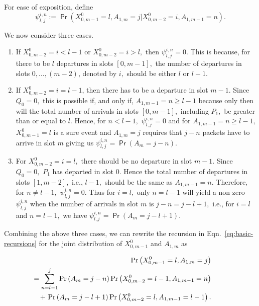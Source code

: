 \documentclass[11pt]{article}
\newcommand{\prob}[1]{\mathsf{\Pr}\left(#1\right)}
\begin{document}
\noindent
For ease of exposition, define
{\small
\begin{displaymath}
  \psi_{l,j}^{i,n}:= \prob{X_{0,m-1}^0=l,A_{1,m} =j | X^0_{0,m-2}=i,
    A_{1,m-1} = n} . 
\end{displaymath}
}
\normalsize

\noindent
We now consider three cases.
\begin{enumerate}
\item If $X^0_{0,m-2} = i < l-1$ or $X^0_{0,m-2} = i > l,$ then
  $\psi_{l,j}^{i,n} =0.$ This is because, for there to be $l$
  departures in slots $[0,m-1],$ the number of departures in slots
  $0,\ldots,(m-2)$, denoted by $i,$ should be either $l$ or $l-1.$

\item If $X^0_{0,m-2} = i = l-1$, then there has to be a departure in
  slot $m-1.$ Since $Q_0=0,$ this is possible if, and only if,
  $A_{1,m-1}=n \geq l-1$ because only then will the total number of
  arrivals in slots $[0,m-1],$ including $P_1,$ be greater than or
  equal to $l.$ Hence, for $n < l-1,$ $\psi_{l,j}^{i,n}=0$ and for
  $A_{1,m-1}=n \geq l-1,$ $X_{0,m-1}^0=l$ is a sure event and
  $A_{1,m}=j$ requires that $j-n$ packets have to arrive in slot $m$
  giving us $\psi_{l,j}^{i,n} = \prob{A_m=j-n}.$

\item For $X^0_{0,m-2} = i=l,$ there should be no departure in slot
  $m-1.$ Since $Q_0=0,$ $P_1$ has departed in slot $0.$ Hence the
  total number of departures in slots $[1,m-2],$ i.e., $l-1,$ should
  be the same as $A_{1,m-1}=n.$ Therefore, for $n \neq l-1,$
  $\psi_{l,j}^{i,n} = 0.$ Thus for $i=l,$ only $n = l-1$ will yield a
  non zero $\psi_{l,j}^{i,n}$ when the number of arrivals in slot $m$
  is $j-n=j-l+1,$ i.e., for $i=l$ and $n=l-1,$ we have
  $\psi_{l,j}^{i,n}=\prob{A_m=j-l+1}.$
\end{enumerate}
Combining the above three cases, we can rewrite the recursion in
Eqn.~\ref{eq:basic-recursions} for the joint distribution of
$X_{0,m-1}^0$ and $A_{1,m}$ as

{\small
\begin{eqnarray}
  && \hspace{-0.45in} \prob{X_{0,m-1}^0=l , A_{1,m}=j } \nonumber \\
  && \hspace{-0.45in} = \sum_{n=l-1}^{j}\prob{A_m=j-n} 
  \prob{X^0_{0,m-2}=l-1, A_{1,m-1} = n} 
  \nonumber \\ 
  && \hspace{-0.45in}  + \ \prob{A_m=j-l+1} \prob{X_{0,m-2}^0=l,
    A_{1,m-1} = l-1} . 
  \label{eq:recursions}
\end{eqnarray}
}
\end{document}
